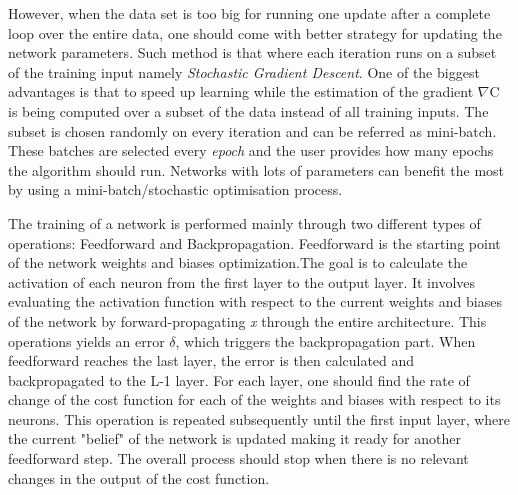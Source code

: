 However, when the data set is too big for running one update after a complete loop over the entire data, one should come with better strategy for updating the network parameters. Such method is that where each iteration runs on a subset of the training input namely \textit{Stochastic Gradient Descent}. One of the biggest advantages is that to speed up learning while the estimation of the gradient $\nabla$C is being computed over a subset of the data instead of all training inputs. The subset is chosen randomly on every iteration and can be referred as mini-batch. These batches are selected every \textit{epoch} and the user provides how many epochs the algorithm should run. Networks with lots of parameters can benefit the most by using a mini-batch/stochastic optimisation process.


The training of a network is performed mainly through two different types of operations: Feedforward and Backpropagation. Feedforward is the starting point of the network weights and biases optimization.The goal is to calculate the activation of each neuron from the first layer to the output layer. It involves evaluating the activation function with respect to the current weights and biases of the network by forward-propagating \textit{x} through the entire architecture. This operations yields an error $\delta$, which triggers the backpropagation part. When feedforward reaches the last layer, the error is then calculated and backpropagated to the L-1 layer. For each layer, one should find the rate of change of the cost function for each of the weights and biases with respect to its neurons. This operation is repeated subsequently until the first input layer, where the current "belief" of the network is updated making it ready for another feedforward step. The overall process should stop when there is no relevant changes in the output of the cost function.

